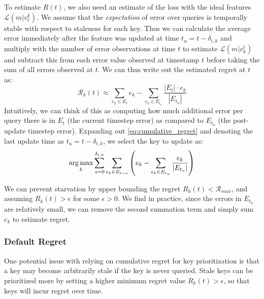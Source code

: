 To estimate $R(t)$, we also need an estimate of the loss with the ideal features $\mathcal{L}(m|v_t^ k)$. We assume that the \textit{expectation} of error over queries is temporally stable with respect to staleness for each key. Thus we can calculate the average error immediately after the feature was updated at time $t_u = t-\delta_{t,k}$ and multiply with the number of error observations at time $t$ to estimate $\mathcal{L}(m|v^t_k)$ and subtract this from each error value observed at timestamp $t$ before taking the sum of all errors observed at $t$. We can thus write out the estimated regret at $t$ as:
\begin{equation}
    \mathcal{R}_k(t) \approx \sum_{e_k \in E_{t}}  e_k -   \sum_{e_k \in E_{t_u}} \frac{ |E_{t}|\cdot e_k}{|E_{t_u}|}  
\end{equation}
Intuitively, we can think of this as computing how much additional error per query there is in $E_t$ (the current timestep error) as compared to $E_{t_u}$ (the post-update timestep error). Expanding out \cref{eq:cumulative_regret} and denoting the last update time as $t_u = t-\delta_{t,k}$, we select the key to update as:  
\begin{equation}
   \operatorname*{arg\,max}_k \sum_{s=0}^{\delta_{t,k}} 
  \sum_{e_k \in E_{t-s}} \left( e_k -   \sum_{e_k \in E_{t_u}} \frac{ e_k}{|E_{t_u}|}  \right)
\end{equation}


We can prevent starvation by upper bounding the regret $R_k(t) < \mathcal{R}_{max}$, and assuming $R_k(t) > \epsilon$ for some $\epsilon > 0$. We find in practice, since the errors in $E_{t_u}$ are relatively small, we can remove the second summation term and simply sum $e_k$ to estimate regret.

\subsubsection{Default Regret}
\label{ss:default-regret}
One potential issue with relying on cumulative regret for key prioritization is that a key may become arbitrarily stale if the key is never queried. Stale keys can be prioritized more by setting a higher minimum regret value $R_k(t) > \epsilon$, so that keys will incur regret over time.

